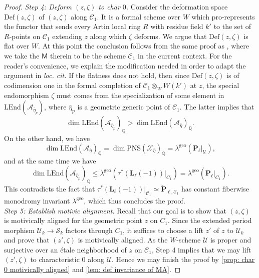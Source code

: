 \documentclass[11pt, letterpaper]{amsart}
\theoremstyle{plain}
\theoremstyle{definition}
\newcommand{\IQ}{\mathbb{Q}}
\newcommand{\sC}{\mathcal{C}}
\newcommand\tensor{{\otimes}}
\newcommand{\<}{\langle}
\renewcommand{\>}{\rangle}
\newcommand{\sU}{\mathcal{U}}
\newcommand{\shS}{\mathscr{S}}
\newcommand{\sfM}{\mathsf{M}}
\newcommand{\sA}{\mathcal{A}}
\newcommand{\sX}{\mathcal{X}}
\newcommand{\bL}{\mathbf{L}}
\newcommand{\LEnd}{\mathrm{LEnd}}
\newcommand{\PNS}{\mathrm{PNS}}
\newcommand{\Def}{\mathrm{Def}}
\newcommand{\bP}{\mathbf{P}}
\newcommand{\geo}{{\mathrm{geo}}}
\begin{document}
\begin{proof}
        \noindent \textit{Step 4: Deform $(z, \zeta)$ to char $0$.} Consider the deformation space $\Def(z, \zeta)$ of $(z, \zeta)$ along $\sC_1$. It is a formal scheme over $W$ which pro-represents the functor that sends every Artin local ring $R$ with residue field $k'$ to the set of $R$-points on $\sC_1$ extending $z$ along which $\zeta$ deforms. We argue that $\Def(z, \zeta)$ is flat over $W$. 
        At this point the conclusion follows from the same proof as \cite[Thm.~5.2.3]{HYZ}, where we take the $\sfM$ therein to be the scheme $\sC_1$ in the current context. 
		For the reader's convenience, we explain the modification needed in order to adapt the argument in \textit{loc. cit.}
        If the flatness does not hold, then since $\Def(z, \zeta)$ is of codimension one in the formal completion of $\sC_1 \tensor_W W(k')$ at $z$, the special endomorphism $\zeta$ must comes from the specialization of some element in $\LEnd(\sA_{\bar{\eta}_p})$, where $\bar{\eta}_p$ is a geometric generic point of $\sC_{1}$. 
		The latter implies that 
		$$\dim \LEnd(\sA_{\bar{\eta}_p})_\IQ  > \dim \LEnd(\sA_{\bar{\eta}})_\IQ. $$ 
		On the other hand, we have 
		$$\dim \LEnd(\sA_{\bar{\eta}})_\IQ = \dim \PNS(\sX_{\bar{\eta}})_\IQ = \lambda^\geo(\bP_\ell |_\sU), $$ 
		and at the same time we have
		$$\dim \LEnd(\sA_{\bar{\eta}_p})_\IQ \le \lambda^\geo(\tau^*(\bL_\ell(-1))|_{C_1}) = \lambda^\geo(\bP_\ell |_{C_1}). $$ 
		This contradicts the fact that $\tau^*(\bL_\ell(-1))|_{\sC_1} \simeq \breve{\bP}_{\ell, \sC_1}$ has constant fiberwise monodromy invariant $\lambda^\geo$, which thus concludes the proof. \\


\noindent \textit{Step 5: Establish motivic alignment.} Recall that our goal is to show that $(z, \zeta)$ is motivically aligned for the geometric point $z$ on $C_1$. 
Since the extended period morphism $\sU_k \to \shS_k$ factors through $C_1$, it suffices to choose a lift $z'$ of $z$ to $\sU_k$ and prove that $(z', \zeta)$ is motivically aligned. 
As the $W$-scheme $\sU$ is proper and surjective over an \'etale neighborhood of $z$ on $\sC_1$, Step 4 implies that we may lift $(z', \zeta)$ to characteristic $0$ along $\sU$. 
Hence we may finish the proof by \cref{prop: char 0 motivically aligned} and \cref{lem: def invariance of MA}. 
\end{proof}
\end{document}
